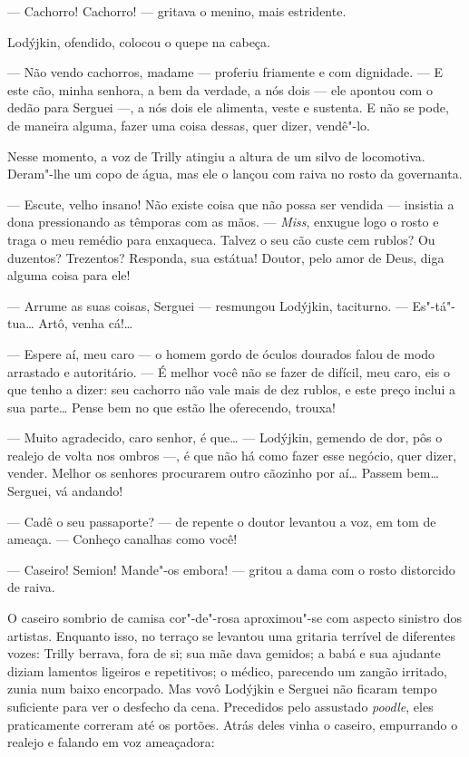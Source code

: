 --- Cachorro! Cachorro! --- gritava o menino, mais estridente.

Lodýjkin, ofendido, colocou o quepe na cabeça.

--- Não vendo cachorros, madame --- proferiu friamente e com dignidade.
--- E este cão, minha senhora, a bem da verdade, a nós dois --- ele
apontou com o dedão para Serguei ---, a nós dois ele alimenta, veste e
sustenta. E não se pode, de maneira alguma, fazer uma coisa dessas, quer
dizer, vendê"-lo.

Nesse momento, a voz de Trilly atingiu a altura de um silvo de
locomotiva. Deram"-lhe um copo de água, mas ele o lançou com raiva no
rosto da governanta.

--- Escute, velho insano! Não existe coisa que não possa ser vendida ---
insistia a dona pressionando as têmporas com as mãos. --- \emph{Miss},
enxugue logo o rosto e traga o meu remédio para enxaqueca. Talvez o seu
cão custe cem rublos? Ou duzentos? Trezentos? Responda, sua estátua!
Doutor, pelo amor de Deus, diga alguma coisa para ele!

--- Arrume as suas coisas, Serguei --- resmungou Lodýjkin, taciturno.
--- Es"-tá"-tua\ldots{} Artô, venha cá!\ldots{}

--- Espere aí, meu caro --- o homem gordo de óculos dourados falou de
modo arrastado e autoritário. --- É melhor você não se fazer de difícil,
meu caro, eis o que tenho a dizer: seu cachorro não vale mais de dez
rublos, e este preço inclui a sua parte\ldots{} Pense bem no que estão lhe
oferecendo, trouxa!

--- Muito agradecido, caro senhor, é que\ldots{} --- Lodýjkin, gemendo de
dor, pôs o realejo de volta nos ombros ---, é que não há como fazer esse
negócio, quer dizer, vender. Melhor os senhores procurarem outro
cãozinho por aí\ldots{} Passem bem\ldots{} Serguei, vá andando!

--- Cadê o seu passaporte? --- de repente o doutor levantou a voz, em
tom de ameaça. --- Conheço canalhas como você!

--- Caseiro! Semion! Mande"-os embora! --- gritou a dama com o rosto
distorcido de raiva.

O caseiro sombrio de camisa cor"-de"-rosa aproximou"-se com aspecto
sinistro dos artistas. Enquanto isso, no terraço se levantou uma
gritaria terrível de diferentes vozes: Trilly berrava, fora de si; sua
mãe dava gemidos; a babá e sua ajudante diziam lamentos ligeiros e
repetitivos; o médico, parecendo um zangão irritado, zunia num baixo
encorpado. Mas vovô Lodýjkin e Serguei não ficaram tempo suficiente para
ver o desfecho da cena. Precedidos pelo assustado \emph{poodle}, eles
praticamente correram até os portões. Atrás deles vinha o caseiro,
empurrando o realejo e falando em voz ameaçadora:

